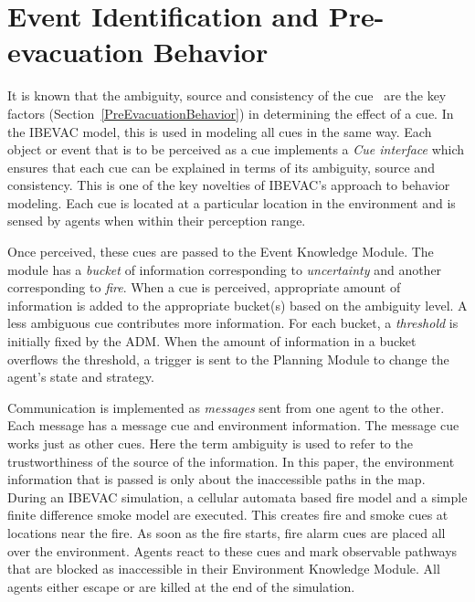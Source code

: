 \section{Event Identification and Pre-evacuation Behavior}
\label{PreEvac:EventIdentification}

It is known that the ambiguity, source and consistency of the cue~\cite{Kuligowski:2005tt,Sime:1983uy,Tong:1985wn} are the key factors (Section~\ref{PreEvacuationBehavior}) in determining the effect of a cue. In the IBEVAC model, this is used in modeling all cues in the same way. Each object or event that is to be perceived as a cue implements a \emph{Cue interface} which ensures that each cue can be explained in terms of its ambiguity, source and consistency. This is one of the key novelties of IBEVAC's approach to behavior modeling. Each cue is located at a particular location in the environment and is sensed by agents when within their perception range.

Once perceived, these cues are passed to the Event Knowledge Module. The  module has a \emph{bucket} of information corresponding to \emph{uncertainty} and another corresponding to \emph{fire}. When a cue is perceived, appropriate amount of information is added to the appropriate bucket(s) based on the ambiguity level. A less ambiguous cue contributes more information. For each bucket, a \emph{threshold} is initially fixed by the ADM. When the amount of information in a bucket overflows the threshold, a trigger is sent to the Planning Module to change the agent's state and strategy.

Communication is implemented as \emph{messages} sent from one agent to the other. Each message has a message cue and environment information. The message cue works just as other cues. Here the term ambiguity is used to refer to the trustworthiness of the source of the information. In this paper, the environment information that is passed is only about the inaccessible paths in the map. %
During an IBEVAC simulation, a cellular automata based fire model and a simple finite difference smoke model are executed. This creates fire and smoke cues at locations near the fire. As soon as the fire starts, fire alarm cues are placed all over the environment. Agents react to these cues and mark observable pathways that are blocked as inaccessible in their Environment Knowledge Module. All agents either escape or are killed at the end of the simulation.



